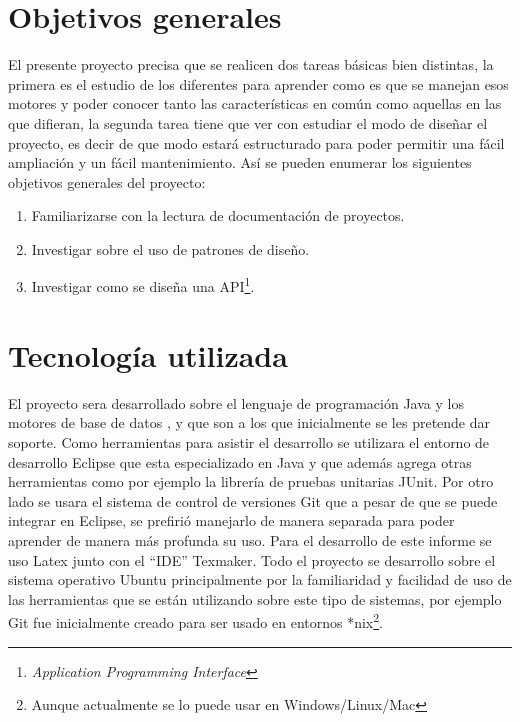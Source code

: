 \section{Objetivos generales}
El presente proyecto precisa que se realicen dos tareas básicas bien distintas, la primera es el estudio de los diferentes \dd para aprender como es que se manejan esos motores y poder conocer tanto las características en común como aquellas en las que difieran, la segunda tarea tiene que ver con estudiar el modo de diseñar el proyecto, es decir de que modo estará estructurado \jj para poder permitir una fácil ampliación y un fácil mantenimiento. Así se pueden enumerar los siguientes objetivos generales del proyecto:
\begin{enumerate}
\item Familiarizarse con la lectura de documentación de proyectos.
\item Investigar sobre el uso de patrones de diseño.
\item Investigar como se diseña una API\footnote{\textit{Application Programming Interface}}.
\end{enumerate}
%
\section{Tecnología utilizada}
El proyecto sera desarrollado sobre el lenguaje de programación Java y los motores de base de datos \m, \p y \s que son a los que inicialmente se les pretende dar soporte. Como herramientas para asistir el desarrollo se utilizara el entorno de desarrollo Eclipse que esta especializado en Java y que además agrega otras herramientas como por ejemplo la librería de pruebas unitarias JUnit. Por otro lado se usara el sistema de control de versiones Git que a pesar de que se puede integrar en Eclipse, se prefirió manejarlo de manera separada para poder aprender de manera más profunda su uso. Para el desarrollo de este informe se uso Latex junto con el ``IDE'' Texmaker. Todo el proyecto se desarrollo sobre el sistema operativo Ubuntu principalmente por la familiaridad y facilidad de uso de las herramientas que se están utilizando sobre este tipo de sistemas, por ejemplo Git fue inicialmente creado para ser usado en entornos *nix\footnote{Aunque actualmente se lo puede usar en Windows/Linux/Mac}.
%
%
%
%
